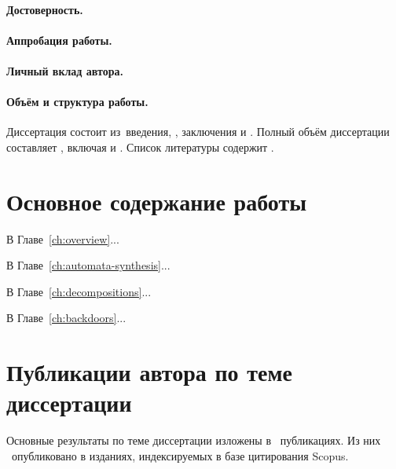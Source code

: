 \paragraph*{Достоверность.}
\paragraph*{Аппробация работы.}
\paragraph*{Личный вклад автора.}


\paragraph*{Объём и структура работы.}
Диссертация состоит из~введения,
,
заключения и
.
%
Полный объём диссертации составляет
, включая
 и
.
Список литературы содержит
.




\newpage
\section*{Основное содержание работы}

В Главе~\ref{ch:overview}...

В Главе~\ref{ch:automata-synthesis}...

В Главе~\ref{ch:decompositions}...

В Главе~\ref{ch:backdoors}...


\section*{Публикации автора по теме диссертации}

Основные результаты по теме диссертации изложены в \theAllMyPapers~публикациях.
Из них
\theScopusPapers~опубликовано в изданиях, индексируемых в базе цитирования Scopus.


